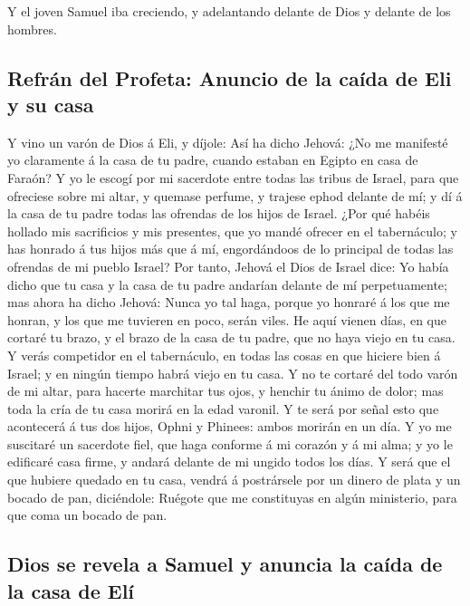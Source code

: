  Y el joven Samuel iba creciendo, y adelantando delante
de Dios y delante de los hombres.

\hypertarget{refruxe1n-del-profeta-anuncio-de-la-cauxedda-de-eli-y-su-casa}{%
\subsection{Refrán del Profeta: Anuncio de la caída de Eli y su
casa}\label{refruxe1n-del-profeta-anuncio-de-la-cauxedda-de-eli-y-su-casa}}

 Y vino un varón de Dios á Eli, y díjole: Así ha dicho
Jehová: ¿No me manifesté yo claramente á la casa de tu padre, cuando
estaban en Egipto en casa de Faraón?  Y yo le escogí por
mi sacerdote entre todas las tribus de Israel, para que ofreciese sobre
mi altar, y quemase perfume, y trajese ephod delante de mí; y dí á la
casa de tu padre todas las ofrendas de los hijos de Israel.
 ¿Por qué habéis hollado mis sacrificios y mis presentes,
que yo mandé ofrecer en el tabernáculo; y has honrado á tus hijos más
que á mí, engordándoos de lo principal de todas las ofrendas de mi
pueblo Israel?  Por tanto, Jehová el Dios de Israel dice:
Yo había dicho que tu casa y la casa de tu padre andarían delante de mí
perpetuamente; mas ahora ha dicho Jehová: Nunca yo tal haga, porque yo
honraré á los que me honran, y los que me tuvieren en poco, serán viles.
 He aquí vienen días, en que cortaré tu brazo, y el brazo
de la casa de tu padre, que no haya viejo en tu casa.  Y
verás competidor en el tabernáculo, en todas las cosas en que hiciere
bien á Israel; y en ningún tiempo habrá viejo en tu casa.
 Y no te cortaré del todo varón de mi altar, para hacerte
marchitar tus ojos, y henchir tu ánimo de dolor; mas toda la cría de tu
casa morirá en la edad varonil.  Y te será por señal esto
que acontecerá á tus dos hijos, Ophni y Phinees: ambos morirán en un
día.  Y yo me suscitaré un sacerdote fiel, que haga
conforme á mi corazón y á mi alma; y yo le edificaré casa firme, y
andará delante de mi ungido todos los días.  Y será que
el que hubiere quedado en tu casa, vendrá á postrársele por un dinero de
plata y un bocado de pan, diciéndole: Ruégote que me constituyas en
algún ministerio, para que coma un bocado de pan.

\hypertarget{dios-se-revela-a-samuel-y-anuncia-la-cauxedda-de-la-casa-de-eluxed}{%
\subsection{Dios se revela a Samuel y anuncia la caída de la casa de
Elí}\label{dios-se-revela-a-samuel-y-anuncia-la-cauxedda-de-la-casa-de-eluxed}}


